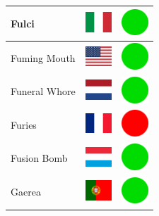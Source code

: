 \documentclass[12pt, a4paper, twoside]{report}
\begin{document}
\begin{center}
\begin{longtable}{|p{5cm}|p{2cm}|p{2cm}|}
 Fulci                                                      & \includegraphics[width=1cm]{../4x3/it} &   \includegraphics[width=1cm]{../likes/y} \\ \hline
 Fuming Mouth                                               & \includegraphics[width=1cm]{../4x3/us} &   \includegraphics[width=1cm]{../likes/y} \\ \hline
 Funeral Whore                                              & \includegraphics[width=1cm]{../4x3/nl} &   \includegraphics[width=1cm]{../likes/y} \\ \hline
 Furies                                                     & \includegraphics[width=1cm]{../4x3/fr} &   \includegraphics[width=1cm]{../likes/n} \\ \hline
 Fusion Bomb                                                & \includegraphics[width=1cm]{../4x3/lu} &   \includegraphics[width=1cm]{../likes/y} \\ \hline
 Gaerea                                                     & \includegraphics[width=1cm]{../4x3/pt} &   \includegraphics[width=1cm]{../likes/y} \\ \hline

\end{longtable}
\end{center}
\end{document}
